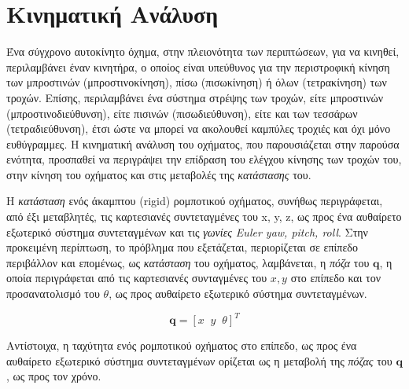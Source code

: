 
\bigskip
\section{Κινηματική Ανάλυση} \label{sec:kinematic_analysis}
Ένα σύγχρονο αυτοκίνητο όχημα, στην πλειονότητα των περιπτώσεων, για να κινηθεί, περιλαμβάνει έναν κινητήρα, ο οποίος είναι υπεύθυνος για την περιστροφική κίνηση των μπροστινών (μπροστινοκίνηση), πίσω (πισωκίνηση) ή όλων (τετρακίνηση) των τροχών. Επίσης, περιλαμβάνει ένα σύστημα στρέψης των τροχών, είτε μπροστινών (μπροστινοδιεύθυνση), είτε πισινών (πισωδιεύθυνση), είτε και των τεσσάρων (τετραδιεύθυνση), έτσι ώστε να μπορεί να ακολουθεί καμπύλες τροχιές και όχι μόνο ευθύγραμμες. Η κινηματική ανάλυση του οχήματος, που παρουσιάζεται στην παρούσα ενότητα, προσπαθεί να περιγράψει την επίδραση του ελέγχου κίνησης των τροχών του, στην κίνηση του οχήματος και στις μεταβολές της \textit{κατάστασης} του.

\bigskip
Η \textit{κατάσταση} ενός άκαμπτου (rigid) ρομποτικού οχήματος, συνήθως περιγράφεται, από έξι μεταβλητές, τις καρτεσιανές συντεταγμένες του x, y, z, ως προς ένα αυθαίρετο εξωτερικό σύστημα συντεταγμένων και τις \textit{γωνίες Euler yaw, pitch, roll}. Στην προκειμένη περίπτωση, το πρόβλημα που εξετάζεται, περιορίζεται σε επίπεδο περιβάλλον και επομένως, ως \textit{κατάσταση} του οχήματος, λαμβάνεται, η \textit{πόζα} του $\mathbf{q}$, η οποία περιγράφεται από τις καρτεσιανές συνταγμένες του $x, y$ στο επίπεδο και τον προσανατολισμό του $\theta$, ως προς αυθαίρετο εξωτερικό σύστημα συντεταγμένων.

\begin{equation}
	\textbf{q} = [x\;\; y\;\; \theta]^T
	\label{eq:pose}
\end{equation}

\bigskip
Αντίστοιχα, η ταχύτητα ενός ρομποτικού οχήματος στο επίπεδο, ως προς ένα αυθαίρετο εξωτερικό σύστημα συντεταγμένων ορίζεται ως η μεταβολή της \textit{πόζας} του $\mathbf{q}$, ως προς τον χρόνο.

